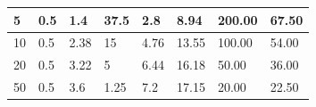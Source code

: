 \documentclass[dvipdfmx,titlepage,a4j]{jsarticle}  %
\begin{document}
\begin{table}[H]
\begin{tabular}{ll|ll|llll}
  \multicolumn{1}{l|}{5}             & 0.5         & \multicolumn{1}{l|}{1.4}         & 37.5            & \multicolumn{1}{l|}{2.8}     & \multicolumn{1}{l|}{8.94}            & \multicolumn{1}{l|}{200.00}          & 67.50                               \\ \hline
  \multicolumn{1}{l|}{10}            & 0.5         & \multicolumn{1}{l|}{2.38}        & 15              & \multicolumn{1}{l|}{4.76}    & \multicolumn{1}{l|}{13.55}           & \multicolumn{1}{l|}{100.00}          & 54.00                               \\ \hline
  \multicolumn{1}{l|}{20}            & 0.5         & \multicolumn{1}{l|}{3.22}        & 5               & \multicolumn{1}{l|}{6.44}    & \multicolumn{1}{l|}{16.18}           & \multicolumn{1}{l|}{50.00}           & 36.00                               \\ \hline
  \multicolumn{1}{l|}{50}            & 0.5         & \multicolumn{1}{l|}{3.6}         & 1.25            & \multicolumn{1}{l|}{7.2}     & \multicolumn{1}{l|}{17.15}           & \multicolumn{1}{l|}{20.00}           & 22.50  
  \end{tabular}
\end{table}
\end{document}
